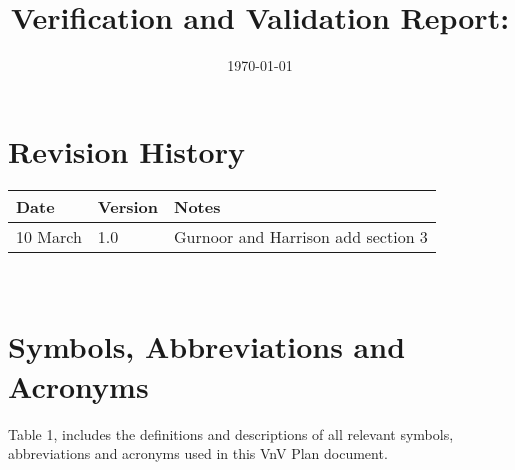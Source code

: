 \documentclass[12pt, titlepage]{article}
\begin{document}
\title{Verification and Validation Report: \progname} 
\author{\authname}
\date{\today}
	
\maketitle


\section{Revision History}

\begin{tabularx}{\textwidth}{p{3cm}p{2cm}X}
\toprule {\bf Date} & {\bf Version} & {\bf Notes}\\
\midrule
10 March & 1.0 & Gurnoor and Harrison add section 3\\
\bottomrule
\end{tabularx}

~\newpage

\section{Symbols, Abbreviations and Acronyms}

Table 1, includes the definitions and descriptions of all relevant symbols,
abbreviations and acronyms used in this VnV Plan document.
\end{document}
